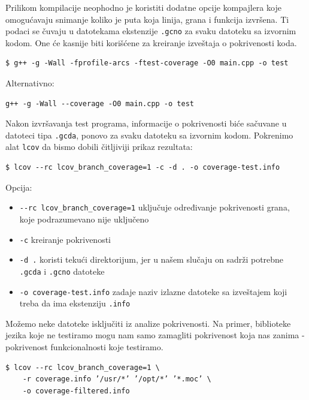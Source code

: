 Prilikom kompilacije neophodno je koristiti dodatne opcije kompajlera koje omogućavaju snimanje koliko je puta koja linija, grana i funkcija izvršena. Ti podaci se čuvaju u datotekama ekstenzije \texttt{.gcno} za svaku datoteku sa izvornim kodom. One će kasnije biti korišćene za kreiranje izveštaja o pokrivenosti koda.

\begin{verbatim}
$ g++ -g -Wall -fprofile-arcs -ftest-coverage -O0 main.cpp -o test
\end{verbatim}

Alternativno:

\begin{verbatim}
g++ -g -Wall --coverage -O0 main.cpp -o test
\end{verbatim}

Nakon izvršavanja test programa, informacije o pokrivenosti biće sačuvane u datoteci tipa \texttt{.gcda}, ponovo za svaku datoteku sa izvornim kodom. Pokrenimo alat \texttt{lcov} da bismo dobili čitljiviji prikaz rezultata:

\begin{verbatim}
$ lcov --rc lcov_branch_coverage=1 -c -d . -o coverage-test.info
\end{verbatim}

Opcija:

\begin{itemize}
\tightlist
\item
  \texttt{-\/-rc\ lcov\_branch\_coverage=1} uključuje određivanje pokrivenosti grana, koje podrazumevano nije uključeno
\item
  \texttt{-c} kreiranje pokrivenosti
\item
  \texttt{-d\ .} koristi tekući direktorijum, jer u našem slučaju on sadrži potrebne \texttt{.gcda} i \texttt{.gcno} datoteke
\item
  \texttt{-o\ coverage-test.info} zadaje naziv izlazne datoteke sa izveštajem koji treba da ima ekstenziju \texttt{.info}
\end{itemize}

Možemo neke datoteke isključiti iz analize pokrivenosti. Na primer, biblioteke jezika koje ne testiramo mogu nam samo zamagliti pokrivenost koja nas zanima - pokrivenost funkcionalnosti koje testiramo.

\begin{verbatim}
$ lcov --rc lcov_branch_coverage=1 \
    -r coverage.info ’/usr/*’ ’/opt/*’ ’*.moc’ \
    -o coverage-filtered.info
\end{verbatim}


